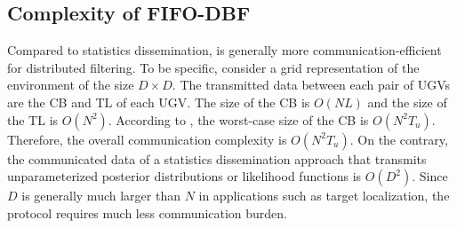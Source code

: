 	
	
	
	\subsection{Complexity of FIFO-DBF}
	Compared to statistics dissemination, {\proto} is generally more communication-efficient for distributed filtering. 
	To be specific, consider a grid representation of the environment of the size $D\times D$. %
	The transmitted data between each pair of UGVs are the CB and TL of each UGV.
	The size of the CB is $O(NL)$ and the size of the TL is $O(N^2)$.
	According to , the worst-case size of the CB is $O(N^2T_u)$.
	Therefore, the overall communication complexity is $O(N^2T_u)$.	
	On the contrary, the communicated data of a statistics dissemination approach that transmits unparameterized posterior distributions or likelihood functions is $O(D^2)$.
	Since $D$ is generally much larger than $N$ in applications such as target localization, the {\proto} protocol requires much less communication burden.
	
